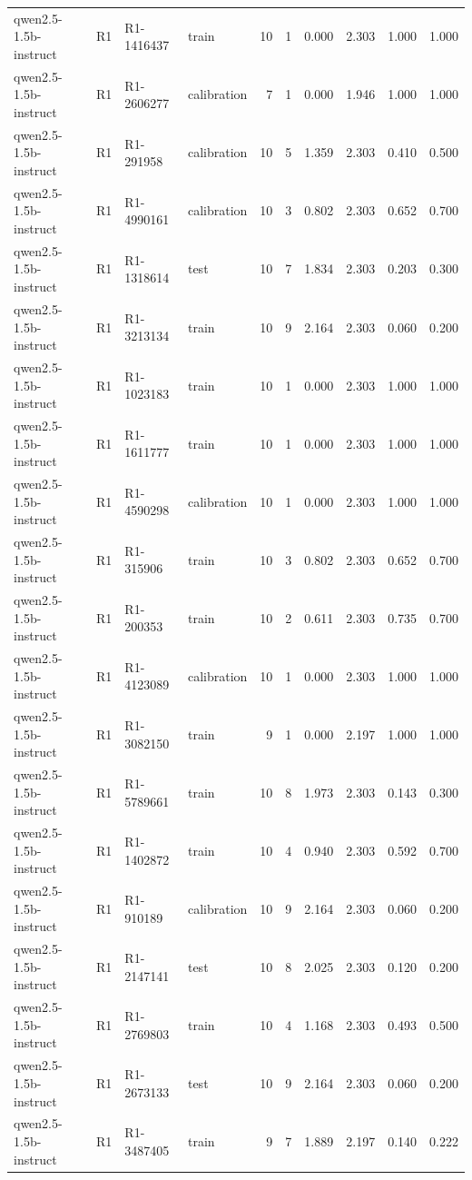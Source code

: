 \begin{table}
\begin{tabular}{llllrrrrrr}
qwen2.5-1.5b-instruct & R1 & R1-1416437 & train & 10 & 1 & 0.000 & 2.303 & 1.000 & 1.000 \\
qwen2.5-1.5b-instruct & R1 & R1-2606277 & calibration & 7 & 1 & 0.000 & 1.946 & 1.000 & 1.000 \\
qwen2.5-1.5b-instruct & R1 & R1-291958 & calibration & 10 & 5 & 1.359 & 2.303 & 0.410 & 0.500 \\
qwen2.5-1.5b-instruct & R1 & R1-4990161 & calibration & 10 & 3 & 0.802 & 2.303 & 0.652 & 0.700 \\
qwen2.5-1.5b-instruct & R1 & R1-1318614 & test & 10 & 7 & 1.834 & 2.303 & 0.203 & 0.300 \\
qwen2.5-1.5b-instruct & R1 & R1-3213134 & train & 10 & 9 & 2.164 & 2.303 & 0.060 & 0.200 \\
qwen2.5-1.5b-instruct & R1 & R1-1023183 & train & 10 & 1 & 0.000 & 2.303 & 1.000 & 1.000 \\
qwen2.5-1.5b-instruct & R1 & R1-1611777 & train & 10 & 1 & 0.000 & 2.303 & 1.000 & 1.000 \\
qwen2.5-1.5b-instruct & R1 & R1-4590298 & calibration & 10 & 1 & 0.000 & 2.303 & 1.000 & 1.000 \\
qwen2.5-1.5b-instruct & R1 & R1-315906 & train & 10 & 3 & 0.802 & 2.303 & 0.652 & 0.700 \\
qwen2.5-1.5b-instruct & R1 & R1-200353 & train & 10 & 2 & 0.611 & 2.303 & 0.735 & 0.700 \\
qwen2.5-1.5b-instruct & R1 & R1-4123089 & calibration & 10 & 1 & 0.000 & 2.303 & 1.000 & 1.000 \\
qwen2.5-1.5b-instruct & R1 & R1-3082150 & train & 9 & 1 & 0.000 & 2.197 & 1.000 & 1.000 \\
qwen2.5-1.5b-instruct & R1 & R1-5789661 & train & 10 & 8 & 1.973 & 2.303 & 0.143 & 0.300 \\
qwen2.5-1.5b-instruct & R1 & R1-1402872 & train & 10 & 4 & 0.940 & 2.303 & 0.592 & 0.700 \\
qwen2.5-1.5b-instruct & R1 & R1-910189 & calibration & 10 & 9 & 2.164 & 2.303 & 0.060 & 0.200 \\
qwen2.5-1.5b-instruct & R1 & R1-2147141 & test & 10 & 8 & 2.025 & 2.303 & 0.120 & 0.200 \\
qwen2.5-1.5b-instruct & R1 & R1-2769803 & train & 10 & 4 & 1.168 & 2.303 & 0.493 & 0.500 \\
qwen2.5-1.5b-instruct & R1 & R1-2673133 & test & 10 & 9 & 2.164 & 2.303 & 0.060 & 0.200 \\
qwen2.5-1.5b-instruct & R1 & R1-3487405 & train & 9 & 7 & 1.889 & 2.197 & 0.140 & 0.222 \\

\end{tabular}
\end{table}
